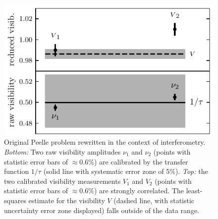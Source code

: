 \documentclass[a4paper,fleqn,usenatbib]{mnras}
\def\data{\ensuremath{{\scriptstyle V}}}
\begin{document}
\begin{figure}
\includegraphics[width=\linewidth]{pdf/original-peelle.pdf}
\caption{Original Peelle problem rewritten in the context of interferometry.  \emph{Bottom:} Two raw visibility amplitudes $\nu_1$ and $\nu_2$ (points with statistic error bars of $\approx 0.6\%$) are calibrated by the transfer function $1/\tau$ (solid line with systematic error zone of 5\%). \emph{Top:} the two calibrated visibility measurements $\data_1$ and $\data_2$ (points with statistic error bars of $\approx 0.6\%$) are strongly correlated. The least-squares estimate for the visibility $\data$ (dashed line, with statistic uncertainty error zone displayed) falls outside of the data range.}
\label{fig:peelle}
\end{figure}
\end{document}
